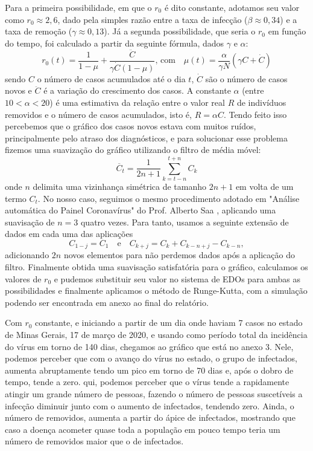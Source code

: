 \documentclass[11pt, a4paper]{article}
\begin{document}
Para a primeira possibilidade, em que o $r_0$ é dito constante, adotamos seu valor como $r_0 \approx 2,6$, dado pela simples razão entre a taxa de infecção ($\beta \approx 0,34$) e a taxa de remoção ($\gamma \approx 0,13$).
Já a segunda possibilidade, que seria o $r_0$ em função do tempo, foi calculado a partir da seguinte fórmula, dados $\gamma$ e $\alpha$:
\[
	r_0(t) = \frac{1}{1 - \mu} + \frac{\ddot{C}}{\gamma \dot{C} (1 - \mu)}
	\text{, com} \quad
	\mu(t) = \frac{\alpha}{\gamma N} (\gamma C + \dot{C})
\]
sendo $C$ o número de casos acumulados até o dia $t$, $\dot{C}$ são o número de casos novos e
$\ddot{C}$ é a variação do crescimento dos casos.
A constante $\alpha$ (entre $10 < \alpha < 20$) é uma estimativa da relação entre o valor real $R$ de indivíduos removidos e o número de casos acumulados, isto é, $R = \alpha C$.
Tendo feito isso percebemos que o gráfico dos casos novos estava com muitos ruídos, principalmente pelo atraso dos diagnósticos, e para solucionar esse problema fizemos uma suavização do gráfico utilizando o filtro de média móvel:
\[
	\overline{C}_t = \frac{1}{2n+1} \sum_{k=t-n}^{t+n} C_k
\]
onde $n$ delimita uma vizinhança simétrica de tamanho $2n+1$ em volta de um termo $C_t$.
No nosso caso, seguimos o mesmo procedimento adotado em "Análise automática do Painel Coronavírus" do Prof. Alberto Saa \cite{pdf_saa}, aplicando uma suavisação de $n=3$ quatro vezes.
Para tanto, usamos a seguinte extensão de dados em cada uma das aplicações
\[
	C_{1-j} = C_1
	\quad \text{e} \quad
	C_{k+j} = C_k + C_{k-n+j} - C_{k-n},
\]
adicionando $2n$ novos elementos para não perdemos dados após a aplicação do filtro.
Finalmente obtida uma suavisação satisfatória para o gráfico, calculamos os valores de $r_0$ e pudemos substituir seu valor no sistema de EDOs para ambas as possibilidades e finalmente aplicamos o método de Runge-Kutta, com a simulação podendo ser encontrada em anexo ao final do relatório.

Com $r_0$ constante, e iniciando a partir de um dia onde haviam 7 casos no estado de Minas Gerais, 17 de março de 2020, e usando como período total da incidência do vírus em torno de 140 dias, chegamos ao gráfico que está no anexo 3. Nele, podemos perceber que com o avanço do vírus no estado, o grupo de infectados, aumenta abruptamente tendo um pico em torno de 70 dias e, após o dobro de tempo, tende a zero.
qui, podemos perceber  que o vírus tende a rapidamente atingir um grande número de pessoas, fazendo o número de pessoas suscetíveis a infecção diminuir junto com o aumento de infectados, tendendo zero. Ainda, o número de removidos, aumenta a partir do ápice de infectados, mostrando que caso a doença acometer quase toda a população em pouco tempo teria um número de removidos maior que o de infectados.
\end{document}
